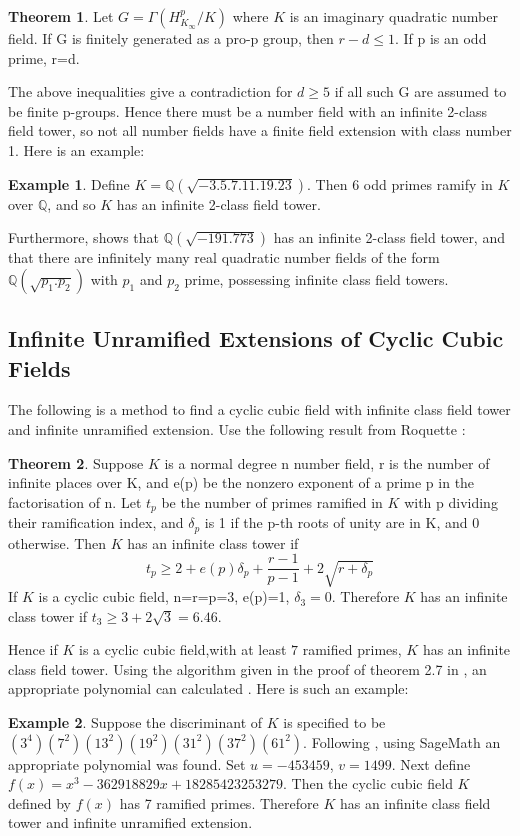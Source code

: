 \documentclass[12pt]{extarticle}
\newcommand{\<}{\langle}
\renewcommand{\>}{\rangle}
\theoremstyle{definition}
\newtheorem{theorem}{Theorem}
\newtheorem*{example}{Example}
\begin{document}
\begin{theorem}
    Let $G = \Gamma(H_{K_{\infty}}^{p}/K)$ where $K$ is an imaginary quadratic number field. If G is finitely generated as a pro-p group, then
$r-d\leq 1 $. If p is an odd prime, r=d.
\end{theorem}
The above inequalities give a contradiction for $d \geq 5$ if all such G are assumed to be finite p-groups. Hence there must be a number field with an infinite 2-class field tower, so not all number fields have a finite field extension with class number 1. Here is an example:
\begin{example}
    Define $K=\mathbb{Q}(\sqrt{-3.5.7.11.19.23})$. Then 6 odd primes ramify in $K$ over $\mathbb{Q}$, and so $K$ has an infinite 2-class field tower. 
\end{example}
Furthermore, \cite{SCHO} shows that $\mathbb{Q}(\sqrt{-191.773})$ has an infinite 2-class field tower, and that there are infinitely many real quadratic number fields of the form $\mathbb{Q}(\sqrt{p_1.p_2})$ with $p_1$ and $p_2$ prime, possessing infinite class field towers. 

\subsection{Infinite Unramified Extensions of Cyclic Cubic Fields }
The following is a method to find a cyclic cubic field with infinite class field tower and infinite unramified extension. Use the following result from Roquette \cite{KOCH}:
\begin{theorem}
    Suppose $K$ is a normal degree n number field, r is the number of infinite places over K, and e(p) be the nonzero exponent of a prime p in the factorisation of n. Let $t_p$ be the number of primes ramified in $K$ with p dividing their ramification index, and $\delta_p$ is 1 if the p-th roots of unity are in K, and 0 otherwise. Then $K$ has an infinite class tower if \begin{equation}
        t_p\geqslant 2 + e(p)\delta_p + \frac{r-1}{p-1} + 2 \sqrt{r+\delta_p}
    \end{equation}
 If $K$ is a cyclic cubic field,  n=r=p=3, e(p)=1, $\delta_3 = 0$. Therefore $K$ has an infinite class tower if $t_3 \geq 3 + 2\sqrt{3} = 6.46$. 
\end{theorem}
Hence if $K$ is a cyclic cubic field,with at least $7$ ramified primes, $K$ has an infinite class field tower. Using the algorithm given in the proof of theorem 2.7 in \cite{WONG}, an appropriate polynomial can calculated . Here is such an example:
\begin{example}
    Suppose the discriminant of $K$ is specified to be $(3^4)(7^2)(13^2)(19^2)(31^2)(37^2)(61^2)$. Following \cite{WONG}, using SageMath an appropriate polynomial was found. Set $u = -453459$, $v=1499$.  Next define $f(x) = x^3-362918829x + 18285423253279$. Then the cyclic cubic field $K$ defined by $f(x)$ has 7 ramified primes. Therefore $K$ has an infinite class field tower and infinite unramified extension. 
\end{example}
\end{document}
